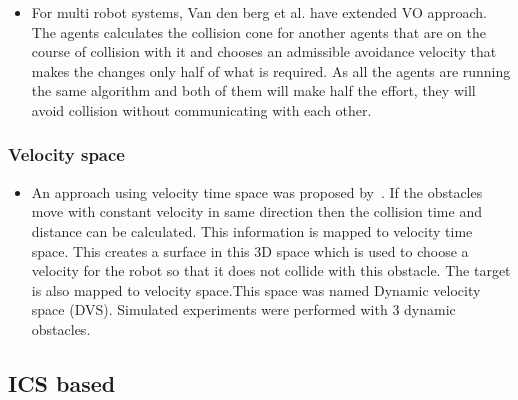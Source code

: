 \begin{itemize}
\item For multi robot systems, Van den berg et al.\cite{van2008reciprocal}\cite{van2011reciprocal} have extended VO approach. The agents calculates the collision cone for another agents that are on the course of collision with it and chooses an admissible avoidance velocity that makes the changes only half of what is required. As all the agents are running the same algorithm and both of them will make half the effort, they will avoid collision without communicating with each other.
\end{itemize}

\subsubsection{Velocity space}%
\label{subsub:velocity_space}
\begin{itemize}
    \item An approach using velocity time space was proposed by~\cite{owen2005motion}\cite{owen2006a}. If the obstacles move with constant velocity in same direction then the collision time and distance can be calculated. This information is mapped to velocity time space. This creates a surface in this 3D space which is used to choose a velocity for the robot so that it does not collide with this obstacle. The target is also mapped to velocity space.This space was named Dynamic velocity space (DVS). Simulated experiments were performed with 3 dynamic obstacles.
\end{itemize}



\subsection{ICS based}%
\label{sub:ics_based}

